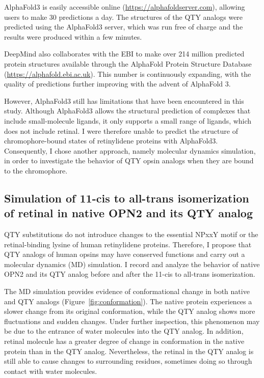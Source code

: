\documentclass[fleqn, 10pt]{manuscript}
\begin{document}
AlphaFold3 is easily accessible online (\url{https://alphafoldserver.com}), allowing users to make 30 predictions a day. The structures of the QTY analogs were predicted using the AlphaFold3 server, which was run free of charge and the results were produced within a few minutes. 

DeepMind also collaborates with the EBI to make over 214 million predicted protein structures available through the AlphaFold Protein Structure Database (\url{https://alphafold.ebi.ac.uk}). This number is continuously expanding, with the quality of predictions further improving with the advent of AlphaFold 3. 

However, AlphaFold3 still has limitations that have been encountered in this study. Although AlphaFold3 allows the structural prediction of complexes that include small-molecule ligands, it only supports a small range of ligands, which does not include retinal. I were therefore unable to predict the structure of chromophore-bound states of retinylidene proteins with AlphaFold3. Consequently, I chose another approach, namely molecular dynamics simulation, in order to investigate the behavior of QTY opsin analogs when they are bound to the chromophore. 

\subsection*{Simulation of 11-cis to all-trans isomerization of retinal in native OPN2 and its QTY analog}

QTY substitutions do not introduce changes to the essential NPxxY motif or the retinal-binding lysine of human retinylidene proteins. Therefore, I propose that QTY analogs of human opsins may have conserved functions and carry out a molecular dynamics (MD) simulation. I record and analyze the behavior of native OPN2 and its QTY analog before and after the 11-cis to all-trans isomerization. 

The MD simulation provides evidence of conformational change in both native and QTY analogs (Figure~\ref{fig:conformation}). The native protein experiences a slower change from its original conformation, while the QTY analog shows more fluctuations and sudden changes. Under further inspection, this phenomenon may be due to the entrance of water molecules into the QTY analog. In addition, retinal molecule has a greater degree of change in conformation in the native protein than in the QTY analog. Nevertheless, the retinal in the QTY analog is still able to cause changes to surrounding residues, sometimes doing so through contact with water molecules. 
\end{document}

